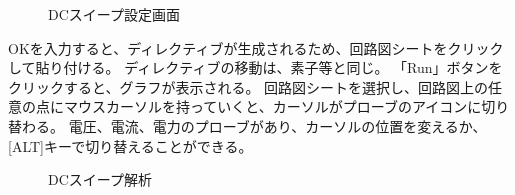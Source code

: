     \begin{figure}[htb]
      \begin{center}
      \caption{DCスイープ設定画面}
      \label{dc}
      \end{center}
    \end{figure}
    OKを入力すると、ディレクティブが生成されるため、回路図シートをクリックして貼り付ける。
    ディレクティブの移動は、素子等と同じ。
    「Run」ボタンをクリックすると、グラフが表示される。
    回路図シートを選択し、回路図上の任意の点にマウスカーソルを持っていくと、カーソルがプローブのアイコンに切り替わる。
    電圧、電流、電力のプローブがあり、カーソルの位置を変えるか、[ALT]キーで切り替えることができる。
    \begin{figure}[htb]
      \begin{center}
      \caption{DCスイープ解析}
      \label{dckekka}
      \end{center}
    \end{figure}
